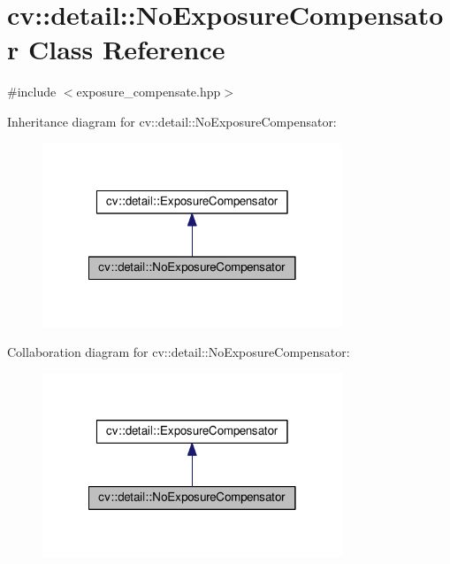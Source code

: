 \hypertarget{classcv_1_1detail_1_1NoExposureCompensator}{\section{cv\-:\-:detail\-:\-:No\-Exposure\-Compensator Class Reference}
\label{classcv_1_1detail_1_1NoExposureCompensator}
}


{\ttfamily \#include $<$exposure\-\_\-compensate.\-hpp$>$}



Inheritance diagram for cv\-:\-:detail\-:\-:No\-Exposure\-Compensator\-:\nopagebreak
\begin{figure}[H]
\begin{center}
\leavevmode
\includegraphics[width=254pt]{classcv_1_1detail_1_1NoExposureCompensator__inherit__graph}
\end{center}
\end{figure}


Collaboration diagram for cv\-:\-:detail\-:\-:No\-Exposure\-Compensator\-:\nopagebreak
\begin{figure}[H]
\begin{center}
\leavevmode
\includegraphics[width=254pt]{classcv_1_1detail_1_1NoExposureCompensator__coll__graph}
\end{center}
\end{figure}
